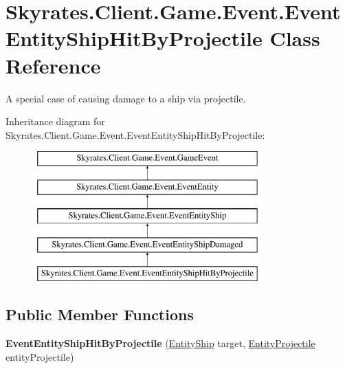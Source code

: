 \hypertarget{class_skyrates_1_1_client_1_1_game_1_1_event_1_1_event_entity_ship_hit_by_projectile}{\section{Skyrates.\-Client.\-Game.\-Event.\-Event\-Entity\-Ship\-Hit\-By\-Projectile Class Reference}
\label{class_skyrates_1_1_client_1_1_game_1_1_event_1_1_event_entity_ship_hit_by_projectile}
}


A special case of causing damage to a ship via projectile.  


Inheritance diagram for Skyrates.\-Client.\-Game.\-Event.\-Event\-Entity\-Ship\-Hit\-By\-Projectile\-:\begin{figure}[H]
\begin{center}
\leavevmode
\includegraphics[height=5.000000cm]{class_skyrates_1_1_client_1_1_game_1_1_event_1_1_event_entity_ship_hit_by_projectile}
\end{center}
\end{figure}
\subsection*{Public Member Functions}
\begin{DoxyCompactItemize}
\item 
\hypertarget{class_skyrates_1_1_client_1_1_game_1_1_event_1_1_event_entity_ship_hit_by_projectile_ac90a49bd0e6c20e2bbcbac31965fe013}{{\bfseries Event\-Entity\-Ship\-Hit\-By\-Projectile} (\hyperlink{class_skyrates_1_1_client_1_1_entity_1_1_entity_ship}{Entity\-Ship} target, \hyperlink{class_skyrates_1_1_client_1_1_entity_1_1_entity_projectile}{Entity\-Projectile} entity\-Projectile)}\label{class_skyrates_1_1_client_1_1_game_1_1_event_1_1_event_entity_ship_hit_by_projectile_ac90a49bd0e6c20e2bbcbac31965fe013}

\end{DoxyCompactItemize}
